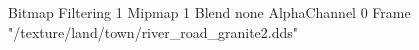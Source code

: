 {Bitmap
	{Filtering 1}
	{Mipmap 1}
	{Blend none}
	{AlphaChannel 0}
	{Frame "/texture/land/town/river_road_granite2.dds"}
}
